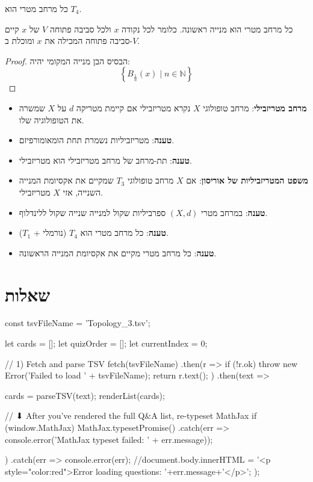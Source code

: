 \documentclass{tstextbook}
\begin{document}
\begin{proposition}
כל מרחב מטרי הוא \(T_{4}\).

\end{proposition}
\begin{proposition}
כל מרחב מטרי הוא מנייה ראשונה. כלומר לכל נקודה \(x\) ולכל סביבה פתוחה \(V\) של \(x\) קיים סביבה פתוחה המכילה את \(x\) ומוכלת ב-\(V\).

\end{proposition}
\begin{proof}
הבסיס הבן מנייה המקומי יהיה:
$$\left\{  B_{\frac{1}{n}}(x)\mid n \in \mathbb{N}  \right\}$$

\end{proof}
\begin{summary}
  \begin{itemize}
    \item \textbf{מרחב מטריזבילי}: מרחב טופולוגי \(X\) נקרא מטריזבילי אם קיימת מטריקה \(d\) על \(X\) שמשרה את הטופולוגיה שלו.
    \item \textbf{טענה}: מטריזביליות נשמרת תחת הומאומורפיזם.
    \item \textbf{טענה}: תת-מרחב של מרחב מטריזבילי הוא מטריזבילי.
    \item \textbf{משפט המטריזביליות של אוריסון}: אם \(X\) מרחב טופולוגי \(T_{3}\) שמקיים את אקסיומת המנייה השנייה, אזי \(X\) מטריזבילי.
    \item \textbf{טענה}: במרחב מטרי \((X,d)\) ספרביליות שקול למנייה שנייה שקול ללינדלוף.
    \item \textbf{טענה}: כל מרחב מטרי הוא \(T_{4}\) (נורמלי + \(T_{1}\)).
    \item \textbf{טענה}: כל מרחב מטרי מקיים את אקסיומת המנייה הראשונה.
  \end{itemize}
\end{summary}
\section{שאלות}


    const tsvFileName = 'Topology_3.tsv';

    let cards = [];
    let quizOrder = [];
    let currentIndex = 0;

    // 1) Fetch and parse TSV
fetch(tsvFileName)
  .then(r => {
    if (!r.ok) throw new Error('Failed to load ' + tsvFileName);
    return r.text();
  })
  .then(text => {
    cards = parseTSV(text);
    renderList(cards);

    // ⬇ After you’ve rendered the full Q&A list, re-typeset MathJax
    if (window.MathJax) {
      MathJax.typesetPromise()
        .catch(err => console.error('MathJax typeset failed: ' + err.message));
    }
  })
  .catch(err => {
    console.error(err);
    //document.body.innerHTML =  '<p style="color:red">Error loading questions: '+err.message+'</p>';
  });
\end{document}

